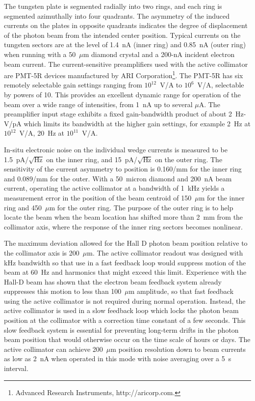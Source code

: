 The tungsten plate is segmented radially into two rings, and each ring is
segmented azimuthally into four quadrants. The asymmetry of the induced 
currents on the plates in opposite quadrants indicates the degree of
displacement of the photon beam from the intended center position. Typical
currents on the tungsten sectors are at the level of 1.4~nA (inner ring)
and 0.85~nA (outer ring) when running with a 50~$\mu$m diamond crystal
and a 200-nA incident electron beam current. The current-sensitive preamplifiers
used with the active collimator are PMT-5R devices manufactured by
ARI Corporation\footnote{Advanced Research Instruments, http://aricorp.com.}. The PMT-5R has six remotely selectable gain settings
ranging from $10^{12}$~V/A to $10^6$~V/A, selectable by powers of 10.
This provides an excellent dynamic
range for operation of the beam over a wide range of intensities, from
1~nA up to several $\mu$A. The preamplifier input stage exhibits a fixed
gain-bandwidth product of about 2~Hz-V/pA which limits its bandwidth at
the higher gain settings, for example 2~Hz at $10^{12}$~V/A, 20~Hz at
$10^{11}$~V/A.

In-situ electronic noise on the individual wedge currents is measured to
be 1.5~pA/$\sqrt{\mbox{Hz}}$ on the inner ring, and 15~pA/$\sqrt{\mbox{Hz}}$
on the outer ring. The sensitivity of the current asymmetry to position is
0.160/mm for the inner ring and 0.089/mm for the outer. 
With a 50~micron diamond and 200~nA beam current, operating the active
collimator at a bandwidth of 1~kHz yields a measurement error in the
position of the beam centroid of 150~$\mu$m for the inner ring and
450~$\mu$m for the outer ring.
The purpose of the outer ring is to help locate the beam when the beam location
has shifted more than 2~mm from the collimator axis, where the response
of the inner ring sectors becomes nonlinear.

The maximum deviation allowed for the Hall D photon beam position 
relative to the collimator axis is 200~$\mu$m. The active collimator
readout was designed with kHz bandwidth so that use in a
fast feedback loop would suppress motion of the beam at 60~Hz and harmonics
that might exceed this limit. Experience with the Hall-D beam has shown
that the electron beam feedback system already suppresses this motion
to less than 100~$\mu$m amplitude, so that fast feedback using the active
collimator is not required during normal operation. Instead, the active collimator is
used in a slow feedback loop which locks the photon beam position at
the collimator with a correction time constant of a few seconds. This
slow feedback system
is essential for preventing long-term drifts in the photon beam
position that would otherwise occur on the time scale of hours or
days. The active collimator can achieve 200~$\mu$m position resolution down to beam currents as low as 2~nA when operated in this mode with noise averaging over a 5~s interval.

